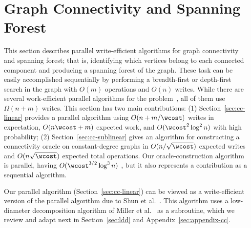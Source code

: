 \section{Graph Connectivity and Spanning Forest}\label{sec:cc}

This section describes parallel write-efficient algorithms for graph
connectivity and spanning forest; that is, identifying which vertices
belong to each connected component and producing a spanning forest of
the graph.  These task can be easily accomplished sequentially by
performing a breadth-first or depth-first search in the graph with
$O(m)$ operations and $O(n)$ writes.  While there are several
work-efficient parallel algorithms for the
problem~\cite{Shun2014,ColeKT96,Gazit1991,PoonR97,PettieR02,Halperin00,HalperinZ96},
all of them use $\Omega(n+m)$ writes.  This section has two main
contributions: (1) Section~\ref{sec:cc-linear} provides a parallel
algorithm using $O(n+m/\wcost)$ writes in expectation,
$O(n\wcost + m)$ expected work, and $O(\wcost^2\log^2n)$ \depth{} with
high probability; (2) Section~\ref{sec:cc-sublinear} gives an
algorithm for constructing a connectivity oracle on constant-degree
graphs in $O(n/\sqrt{\wcost})$ expected writes and $O(n\sqrt{\wcost})$ expected
total operations.  Our oracle-construction algorithm is parallel,
having \depth{} $O(\wcost^{3/2}\log^3n)$ \whp{}, but it also
represents a contribution as a sequential algorithm.

Our parallel algorithm (Section~\ref{sec:cc-linear}) can be viewed as
a write-efficient version of the parallel algorithm due to Shun et
al.~\cite{Shun2014}.  This algorithm uses a low-diameter decomposition
algorithm of Miller et al.~\cite{miller2013parallel} as a subroutine,
which we review and adapt next in Section~\ref{sec:ldd} and
Appendix~\ref{sec:appendix-cc}.


